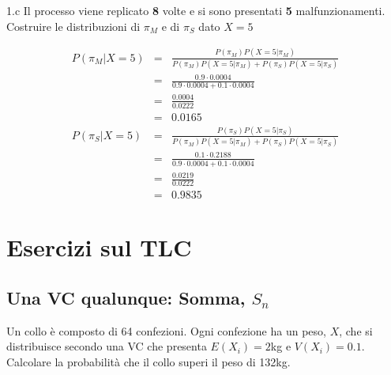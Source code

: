 \documentclass[
  11pt,
]{book}
\theoremstyle{mytheoremstyle}
\theoremstyle{mydefstyle}
\newenvironment{sol}
  {
  \begin{tcolorbox}[enhanced,breakable,arc=0.1mm,boxrule=1pt,colback=white,colframe=iblue,
  title=\bf \fontfamily{lmss}\selectfont \hspace{.5 cm} Soluzione,drop fuzzy shadow]

}{
\end{tcolorbox}
  }
\begin{document}
1.c Il processo viene replicato \textbf{8} volte e si sono presentati \textbf{5} malfunzionamenti. Costruire le distribuzioni di \(\pi_M\) e di \(\pi_S\) dato \(X=5\)

\begin{sol}
\begin{eqnarray*}
P(\pi_M|X=5) &=& \frac{P(\pi_M)P(X=5|\pi_M)}{P(\pi_M)P(X=5|\pi_M) + P(\pi_S)P(X=5|\pi_S)}\\
               &=& \frac{0.9\cdot0.0004}{0.9\cdot0.0004+0.1\cdot0.0004}\\
               &=& \frac{0.0004}{0.0222}\\
               &=& 0.0165\\
P(\pi_S|X=5)   &=& \frac{P(\pi_S)P(X=5|\pi_S)}{P(\pi_M)P(X=5|\pi_M) + P(\pi_S)P(X=5|\pi_S)}\\
               &=& \frac{0.1\cdot0.2188}{0.9\cdot0.0004+0.1\cdot0.0004}\\
               &=& \frac{0.0219}{0.0222}\\
               &=& 0.9835
\end{eqnarray*}

\end{sol}

\chapter{Esercizi sul TLC}\label{esercizi-sul-tlc}

\section{\texorpdfstring{Una VC qualunque: Somma, \(S_{n}\)}{Una VC qualunque: Somma, S\_\{n\}}}\label{una-vc-qualunque-somma-s_n}

Un collo è composto di 64 confezioni. Ogni confezione ha un peso, \(X\),
che si distribuisce secondo una VC che presenta \(E(X_{i})= 2\)kg e
\(V(X_{i})=0.1\). Calcolare la probabilità che il collo superi il peso di
132kg.
\end{document}
